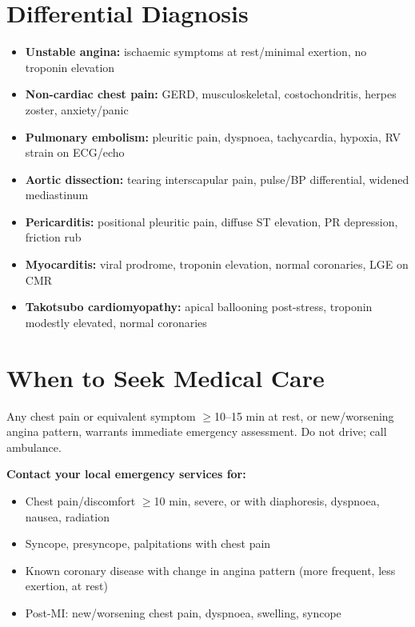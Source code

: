 \section*{Differential Diagnosis}
\begin{itemize}
    \item \textbf{Unstable angina:} ischaemic symptoms at rest/minimal exertion, no troponin elevation
    \item \textbf{Non-cardiac chest pain:} GERD, musculoskeletal, costochondritis, herpes zoster, anxiety/panic
    \item \textbf{Pulmonary embolism:} pleuritic pain, dyspnoea, tachycardia, hypoxia, RV strain on ECG/echo
    \item \textbf{Aortic dissection:} tearing interscapular pain, pulse/BP differential, widened mediastinum
    \item \textbf{Pericarditis:} positional pleuritic pain, diffuse ST elevation, PR depression, friction rub
    \item \textbf{Myocarditis:} viral prodrome, troponin elevation, normal coronaries, LGE on CMR
    \item \textbf{Takotsubo cardiomyopathy:} apical ballooning post-stress, troponin modestly elevated, normal coronaries
\end{itemize}

\section*{When to Seek Medical Care}
Any chest pain or equivalent symptom $\ge$10--15 min at rest, or new/worsening angina pattern, warrants immediate emergency assessment. Do not drive; call ambulance.

\textbf{Contact your local emergency services for:}
\begin{itemize}
    \item Chest pain/discomfort $\ge$10 min, severe, or with diaphoresis, dyspnoea, nausea, radiation
    \item Syncope, presyncope, palpitations with chest pain
    \item Known coronary disease with change in angina pattern (more frequent, less exertion, at rest)
    \item Post-MI: new/worsening chest pain, dyspnoea, swelling, syncope
\end{itemize}

